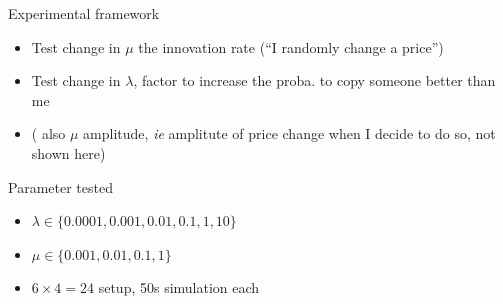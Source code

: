 \documentclass[12pt, notes=show]{beamer}
\begin{document}
\begin{frame}{Experimental framework}
    \begin{itemize}
	\item Test change in $\mu$ the innovation rate (``I randomly change a price'')
	\item Test change in $\lambda$, factor to increase the proba. to copy someone better than me
	\item ( also $\mu$ amplitude, \emph{ie} amplitute of price change when I decide to do so, not shown here)
    \end{itemize}
\end{frame}
\begin{frame}{Parameter tested}
    \begin{itemize}
	\item $\lambda \in \{0.0001,0.001,0.01,0.1,1,10\}$
	\item $\mu \in \{0.001,0.01,0.1,1\}$
	\item  $ 6 \times 4 = 24$ setup, 50s simulation each
    \end{itemize}
\end{frame}
\end{document}
